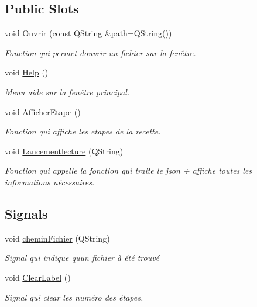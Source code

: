\subsection*{Public Slots}
\begin{DoxyCompactItemize}
\item 
void \hyperlink{class_main_window_a37a30280ba05a52445ecbea9deaa5385}{Ouvrir} (const Q\+String \&path=Q\+String())
\begin{DoxyCompactList}\small\item\em Fonction qui permet d\textquotesingle{}ouvrir un fichier sur la fenêtre. \end{DoxyCompactList}\item 
void \hyperlink{class_main_window_a25ec89113c14218717cfade9a58f8fdb}{Help} ()
\begin{DoxyCompactList}\small\item\em Menu aide sur la fenêtre principal. \end{DoxyCompactList}\item 
void \hyperlink{class_main_window_ae90cd3ee3e8e0b2ddf842514fafd13dc}{Afficher\+Etape} ()
\begin{DoxyCompactList}\small\item\em Fonction qui affiche les etapes de la recette. \end{DoxyCompactList}\item 
void \hyperlink{class_main_window_ac368dfd7e2609f0cb72fc1428771aa97}{Lancementlecture} (Q\+String)
\begin{DoxyCompactList}\small\item\em Fonction qui appelle la fonction qui traite le json + affiche toutes les informations nécessaires. \end{DoxyCompactList}\end{DoxyCompactItemize}
\subsection*{Signals}
\begin{DoxyCompactItemize}
\item 
void \hyperlink{class_main_window_a397116dafcb548fec351091cc025b822}{chemin\+Fichier} (Q\+String)
\begin{DoxyCompactList}\small\item\em Signal qui indique qu\textquotesingle{}un fichier à été trouvé \end{DoxyCompactList}\item 
void \hyperlink{class_main_window_a9a0c33e6e696ffc763560205f992650d}{Clear\+Label} ()
\begin{DoxyCompactList}\small\item\em Signal qui clear les numéro des étapes. \end{DoxyCompactList}\end{DoxyCompactItemize}
